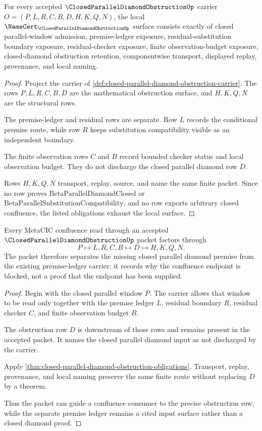 \begin{theorem}
\label{thm:closed-parallel-diamond-obstruction-obligations}
For every accepted $\ClosedParallelDiamondObstructionUp$ carrier $O=(P,L,R,C,B,D,H,K,Q,N)$, the local $\NameCert_{\ClosedParallelDiamondObstructionUp}$ surface consists exactly of closed parallel-window admission, premise-ledger exposure, residual-substitution boundary exposure, residual-checker exposure, finite observation-budget exposure, closed-diamond obstruction retention, componentwise transport, displayed replay, provenance, and local naming.
\end{theorem}
\begin{proof}
Project the carrier of \autoref{def:closed-parallel-diamond-obstruction-carrier}. The rows $P,L,R,C,B,D$ are the mathematical obstruction surface, and $H,K,Q,N$ are the structural rows.

The premise-ledger and residual rows are separate. Row $L$ records the conditional premise route, while row $R$ keeps substitution compatibility visible as an independent boundary.

The finite observation rows $C$ and $B$ record bounded checker status and local observation budget. They do not discharge the closed parallel diamond row $D$.

Rows $H,K,Q,N$ transport, replay, source, and name the same finite packet. Since no row proves $\mathrm{BetaParallelDiamondClosed}$ or $\mathrm{BetaParallelSubstitutionCompatibility}$, and no row exports arbitrary closed confluence, the listed obligations exhaust the local surface.
\end{proof}

\begin{theorem}
\label{thm:closed-parallel-diamond-obstruction-separation}
Every MetaCIC confluence read through an accepted $\ClosedParallelDiamondObstructionUp$ packet factors through
$$
P \longmapsto L,R,C,B \longmapsto D \longmapsto H,K,Q,N .
$$
The packet therefore separates the missing closed parallel diamond premise from the existing premise-ledger carrier: it records why the confluence endpoint is blocked, not a proof that the endpoint has been supplied.
\end{theorem}
\begin{proof}
Begin with the closed parallel window $P$. The carrier allows that window to be read only together with the premise ledger $L$, residual boundary $R$, residual checker $C$, and finite observation budget $B$.

The obstruction row $D$ is downstream of those rows and remains present in the accepted packet. It names the closed parallel diamond input as not discharged by the carrier.

Apply \autoref{thm:closed-parallel-diamond-obstruction-obligations}. Transport, replay, provenance, and local naming preserve the same finite route without replacing $D$ by a theorem.

Thus the packet can guide a confluence consumer to the precise obstruction row, while the separate premise ledger remains a cited input surface rather than a closed diamond proof.
\end{proof}


